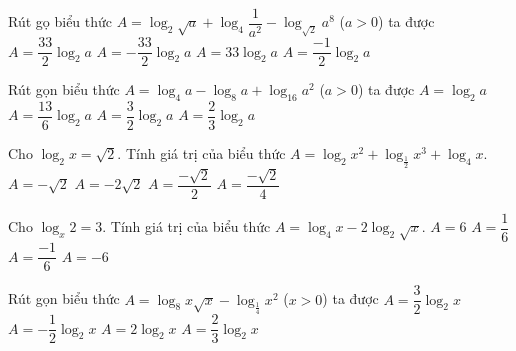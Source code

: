 \begin{ex}%
	Rút gọ biểu thức $A=\log_2\sqrt{a}+\log_4\dfrac{1}{a^2}-\log_{\sqrt{2}}a^8$ ($a>0$) ta được
	\choice
	{$A=\dfrac{33}{2}\log_2a$}
	{\True $A=-\dfrac{33}{2}\log_2a$}
	{$A=33\log_2a$}
	{$A=\dfrac{-1}{2}\log_2a$}
\end{ex}

\begin{ex}%
	Rút gọn biểu thức $A=\log_4a-\log_8a+\log_{16}a^2$ ($a>0$) ta được 
	\choice
	{$A=\log_2a$}
	{$A=\dfrac{13}{6}\log_2a$}
	{$A=\dfrac{3}{2}\log_2a$}
	{\True $A=\dfrac{2}{3}\log_2a$}
\end{ex}

\begin{ex}%
	Cho $\log_2x=\sqrt{2}$. Tính giá trị của biểu thức $A=\log_2x^2+\log_{\tfrac{1}{2}}x^3+\log_4x$. 
	\choice
	{$A=-\sqrt{2}$}
	{$A=-2\sqrt{2}$}
	{\True $A=\dfrac{-\sqrt{2}}{2}$}
	{$A=\dfrac{-\sqrt{2}}{4}$}
\end{ex}

\begin{ex}%
	Cho $\log_x2=3$. Tính giá trị của biểu thức $A=\log_4x-2\log_2\sqrt{x}$.
	\choice
	{$A=6$}
	{$A=\dfrac{1}{6}$}
	{\True $A=\dfrac{-1}{6}$}
	{$A=-6$}
\end{ex}

\begin{ex}%
	Rút gọn biểu thức $A=\log_8x\sqrt{x}-\log_{\tfrac{1}{4}}x^2$ ($x>0$) ta được 
	\choice
	{\True $A=\dfrac{3}{2}\log_2x$}
	{$A=-\dfrac{1}{2}\log_2x$}
	{$A=2\log_2x$}
	{$A=\dfrac{2}{3}\log_2x$}
\end{ex}

